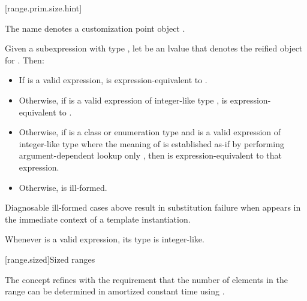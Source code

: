 \documentclass{wg21}
\begin{document}
\begin{addedblock}
[range.prim.size.hint]{}
%

\pnum
The name  denotes a customization point
object .

\pnum
Given a subexpression  with type ,
let  be an lvalue that denotes the reified object for .
Then:

\begin{itemize}
    \item
    If  is a valid expression,  is expression-equivalent to
    .

    \item
    Otherwise, if 
    is a valid expression of integer-like type ,
     is expression-equivalent to
    .

    \item
    Otherwise, if  is a class or enumeration type and 
    is a valid expression of integer-like type
    where the meaning of  is established as-if by performing
    argument-dependent lookup only ,
    then  is expression-equivalent to
    that expression.

    \item
    Otherwise,  is ill-formed.
\end{itemize}

\pnum
\begin{note}
    Diagnosable ill-formed cases above
    result in substitution failure when 
    appears in the immediate context of a template instantiation.
\end{note}

\pnum
\begin{note}
    Whenever  is a valid expression, its
    type is integer-like.
\end{note}

\end{addedblock}

[range.sized]{Sized ranges}

\pnum
The  concept refines  with
the requirement that the number of elements in the range can be determined
in amortized constant time using .
\end{document}
